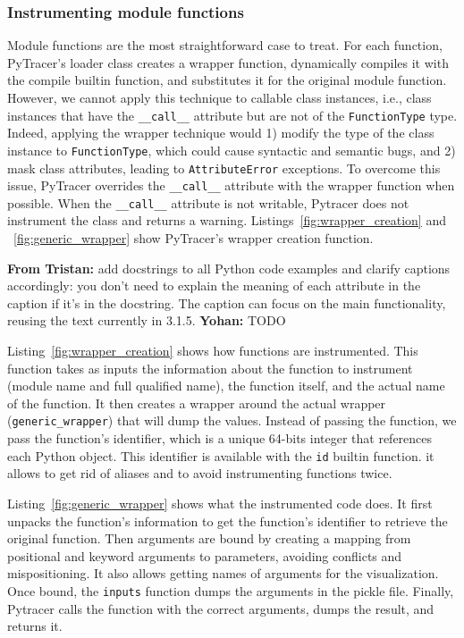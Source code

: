 \documentclass[11pt]{article}
\newcommand{\tristan}[1]{\color{orange}\textbf{From Tristan:} #1\color{black}\xspace}
\newcommand{\Yohan}[1]{\color{green!75!black}\textbf{Yohan:} #1\color{black}\xspace}
\newcommand{\pytracer}[0]{PyTracer\xspace}
\begin{document}
\subsubsection{Instrumenting module functions}

Module functions are the most straightforward case to treat.
For each function, \pytracer's loader class creates a wrapper function, dynamically compiles it with the compile builtin function, and substitutes it for the original module function.
However, we cannot apply this technique to callable class instances, i.e., class instances that have the \texttt{\_\_call\_\_} attribute but are not of the \texttt{FunctionType} type. Indeed, applying the wrapper technique would 1) modify the type of the class instance to \texttt{FunctionType}, which could cause syntactic and semantic bugs, and 2) mask class attributes, leading to \texttt{AttributeError} exceptions.
To overcome this issue, \pytracer overrides the \texttt{\_\_call\_\_} attribute with the wrapper function when possible. When the \texttt{\_\_call\_\_} attribute is not writable,  Pytracer does not instrument the class and returns a warning. 
Listings~\ref{fig:wrapper_creation} and ~\ref{fig:generic_wrapper} show \pytracer's wrapper creation function.

\tristan{add docstrings to all Python code examples and clarify captions accordingly: you don't need to explain the meaning of each attribute in the caption if it's in the docstring. The caption can focus on the main functionality, reusing the text currently in 3.1.5.}
\Yohan{TODO}

Listing~\ref{fig:wrapper_creation} shows how functions are instrumented.
This function takes as inputs the information about the function to instrument (module name and full qualified name),
the function itself, and the actual name of the function. It then creates a wrapper around the actual wrapper
(\texttt{generic\_wrapper}) that will dump the values. Instead of passing the function, we pass the function's identifier, which is a unique 64-bits integer that references each Python object. This identifier is available
with the \texttt{id} builtin function. it allows to get rid of aliases and to avoid instrumenting functions twice. 

Listing~\ref{fig:generic_wrapper} shows what the instrumented code does. 
It first unpacks the function's information to get the function's identifier to retrieve the original function.
Then arguments are bound by creating a mapping from positional and keyword arguments to parameters, avoiding conflicts and mispositioning. It also allows getting names of arguments for the visualization.
Once bound, the \texttt{inputs} function dumps the arguments in the pickle file.
Finally, Pytracer calls the function with the correct arguments, dumps the result, and returns it.
\end{document}
